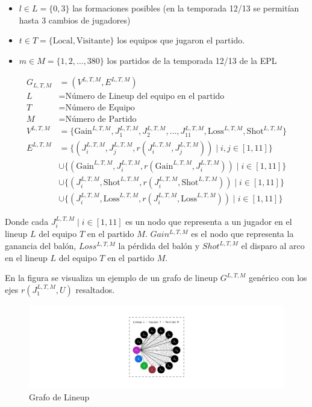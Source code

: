 \documentclass[
  a4paper,
]{article}
\providecommand{\tightlist}{%
  \setlength{\itemsep}{0pt}\setlength{\parskip}{0pt}}
\begin{document}
\begin{itemize}
\tightlist
\item
  \(l \in L = \{0, 3\}\) las formaciones posibles (en la temporada 12/13
  se permitían hasta 3 cambios de jugadores)
\item
  \(t \in T = \{\text{Local}, \text{Visitante}\}\) los equipos que
  jugaron el partido.
\item
  \(m \in M = \{1, 2, \dots, 380\}\) los partidos de la temporada 12/13
  de la EPL
\end{itemize}

\[
\begin{aligned}
    G_{L, T, M} &= (V^{L, T, M}, E^{L, T, M}) \\
    L &= \text{Número de Lineup del equipo en el partido} \\
    T &= \text{Número de Equipo} \\
    M &= \text{Número de Partido} \\
    V^{L, T, M} &= \{\text{Gain}^{L, T, M}, J_1^{L, T, M}, J_2^{L, T, M}, \dots, J_{11}^{L, T, M}, \text{Loss}^{L, T, M}, 
    \text{Shot}^{L, T, M}\} \\
    E^{L, T, M} &= \{(J_i^{L, T, M}, J_j^{L, T, M}, r(J_i^{L, T, M}, J_j^{L, T, M})) \mid i, j \in [1, 11]\} \\ 
    & \cup \{(\text{Gain}^{L, T, M}, J_i^{L, T, M}, r(\text{Gain}^{L, T, M}, J_i^{L, T, M})) \mid i \in [1, 11]\} \\ 
    & \cup \{(J_i^{L, T, M}, \text{Shot}^{L, T, M}, r(J_i^{L, T, M}, \text{Shot}^{L, T, M})) \mid i \in [1, 11]\} \\ 
    & \cup \{(J_i^{L, T, M}, \text{Loss}^{L, T, M}, r(J_i^{L, T, M}, \text{Loss}^{L, T, M})) \mid i \in [1, 11]\}
\end{aligned}
\]

Donde cada \(J_i^{L, T, M} \mid i \in [1, 11]\) es un nodo que
representa a un jugador en el lineup \(L\) del equipo \(T\) en el
partido \(M\). \(Gain^{L, T, M}\) es el nodo que representa la ganancia
del balón, \(Loss^{L, T, M}\) la pérdida del balón y \(Shot^{L, T, M}\)
el disparo al arco en el lineup \(L\) del equipo \(T\) en el partido
\(M\).

En la figura se visualiza un ejemplo de un grafo de lineup
\(G^{L, T, M}\) genérico con los ejes \(r(J_1^{L, T, M}, U)\)
resaltados.

\begin{figure}
  \includegraphics{recursos_pdf/graficos/G_LTM.png}
    \caption{Grafo de Lineup}
\end{figure}
\end{document}

